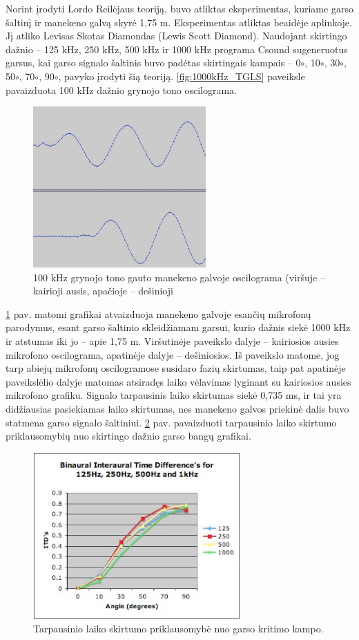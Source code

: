 \documentclass[]{vgtuef}
\begin{document}
Norint įrodyti Lordo Reilėjaus teoriją, buvo atliktas eksperimentas, kuriame garso šaltinį ir manekeno galvą skyrė 1,75 m. Eksperimentas atliktas beaidėje aplinkoje. Jį atliko Levisas Skotas Diamondas (Lewis Scott Diamond).  Naudojant skirtingo dažnio – 125 kHz, 250 kHz, 500 kHz ir 1000 kHz programa Csound sugeneruotus garsus, kai garso signalo šaltinis buvo padėtas skirtingais kampais – 0$\circ$, 10$\circ$, 30$\circ$, 50$\circ$, 70$\circ$, 90$\circ$, pavyko įrodyti šią teoriją. \ref{fig:1000kHz_TGLS} paveiksle pavaizduota 100 kHz dažnio grynojo tono oscilograma.

\begin{figure}[!ht]
  \centering
  \includegraphics[width=250px]{img/100kHz_grynas.png}
  \caption{100 kHz grynojo tono gauto manekeno galvoje oscilograma (viršuje – kairioji ausis, apačioje – dešinioji}
  \label{fig:100kHz_grynas}
\end{figure}

\ref{fig:100kHz_grynas} pav. matomi grafikai atvaizduoja manekeno galvoje esančių mikrofonų parodymus, esant garso šaltinio skleidžiamam garsui, kurio dažnis siekė 1000 kHz ir atstumas iki jo – apie 1,75 m. Viršutinėje paveikslo dalyje – kairiosios ausies mikrofono oscilograma, apatinėje dalyje – dešiniosios. Iš paveikslo matome, jog tarp abiejų mikrofonų oscilogramose susidaro fazių skirtumas, taip pat apatinėje paveikslėlio dalyje matomas atsiradęs laiko vėlavimas lyginant su kairiosios ausies mikrofono grafiku. Signalo tarpausinis laiko skirtumas siekė 0,735 ms, ir tai yra didžiausias pasiekiamas laiko skirtumas, nes manekeno galvos priekinė dalis buvo statmena garso signalo šaltiniui. \ref{fig:TLS_degree} pav. pavaizduoti tarpausinio laiko skirtumo priklausomybių nuo skirtingo dažnio garso bangų grafikai.

\begin{figure}[!ht]
  \centering
  \includegraphics[width=300px]{img/TLS_degree.png}
  \caption{Tarpausinio laiko skirtumo priklausomybė nuo garso kritimo kampo.}
  \label{fig:TLS_degree}
\end{figure}
\end{document}
